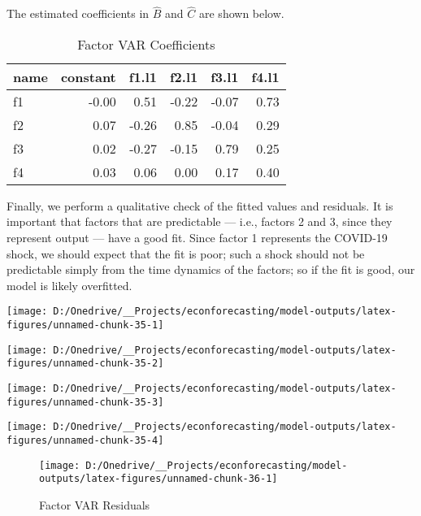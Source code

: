 \documentclass[11pt, letterpaper]{article}\usepackage[]{graphicx}\usepackage[]{color}
\begin{document}
The estimated coefficients in $\widehat{B}$ and $\widehat{C}$ are shown below.
\begin{table}[H]
\centering
\begingroup\footnotesize
\begin{tabular}{lrrrrr}
  \hline
name & constant & f1.l1 & f2.l1 & f3.l1 & f4.l1 \\ 
  \hline
f1 & -0.00 & 0.51 & -0.22 & -0.07 & 0.73 \\ 
  f2 & 0.07 & -0.26 & 0.85 & -0.04 & 0.29 \\ 
  f3 & 0.02 & -0.27 & -0.15 & 0.79 & 0.25 \\ 
  f4 & 0.03 & 0.06 & 0.00 & 0.17 & 0.40 \\ 
   \hline
\end{tabular}
\endgroup
\caption{Factor VAR Coefficients} 
\end{table}



Finally, we perform a qualitative check of the fitted values and residuals. It is important that factors that are predictable --- i.e., factors 2 and 3, since they represent output --- have a good fit. Since factor 1 represents the COVID-19 shock, we should expect that the fit is poor; such a shock should not be predictable simply from the time dynamics of the factors; so if the fit is good, our model is likely overfitted.


{\centering \texttt{[image: D:/Onedrive/\_\_Projects/econforecasting/model-outputs/latex-figures/unnamed-chunk-35-1]} 

}




{\centering \texttt{[image: D:/Onedrive/\_\_Projects/econforecasting/model-outputs/latex-figures/unnamed-chunk-35-2]} 

}




{\centering \texttt{[image: D:/Onedrive/\_\_Projects/econforecasting/model-outputs/latex-figures/unnamed-chunk-35-3]} 

}




{\centering \texttt{[image: D:/Onedrive/\_\_Projects/econforecasting/model-outputs/latex-figures/unnamed-chunk-35-4]} 

}





\begin{figure}[H]

{\centering \texttt{[image: D:/Onedrive/\_\_Projects/econforecasting/model-outputs/latex-figures/unnamed-chunk-36-1]} 

}

\caption[Factor VAR Residuals]{Factor VAR Residuals}\label{fig:unnamed-chunk-36}
\end{figure}
\end{document}
